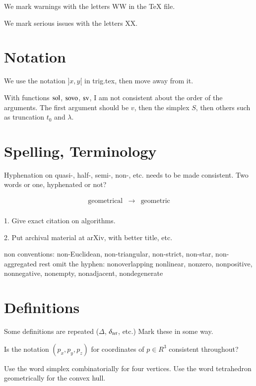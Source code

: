 

\label{XX}\label{tarski:XX}

We mark warnings with the letters WW in 
the TeX file.

We mark serious issues with the letters XX.

\section{Notation}

We use the notation $]x,y[$ in trig.tex, then move away from it.

With functions $\operatorname{sol}$, ${\operatorname{sovo}}$, ${\operatorname{sv}}$, I am not
consistent about the order of the arguments.
The first argument should be $v$, then the simplex $S$,
then others such as truncation $t_0$ and $\lambda$.

\section{Spelling, Terminology}

Hyphenation on  quasi-, half-, semi-, non-, etc. needs to be made
consistent.  Two words or one, hyphenated or not?

$$
\begin{array}{lll}
 \text{geometrical} &\to& \text{geometric}\\
\end{array}
$$


 1. Give exact citation on algorithms.

 2. Put archival material at arXiv, with better title, etc.



 non conventions:
 non-Euclidean, non-triangular, non-strict, non-star, non-aggregated
 rest omit the hyphen: nonoverlapping nonlinear, nonzero, nonpositive, nonnegative,
   nonempty, nonadjacent, nondegenerate




\section{Definitions}

Some definitions are repeated ($\Delta$, $\delta_{tet}$, etc.)
Mark these in some way.

Is the notation $(p_x,p_y,p_z)$ for coordinates 
of $p\in R^3$ consistent throughout?

Use the word simplex combinatorially for four vertices.
Use the word tetrahedron geometrically for the convex hull.

